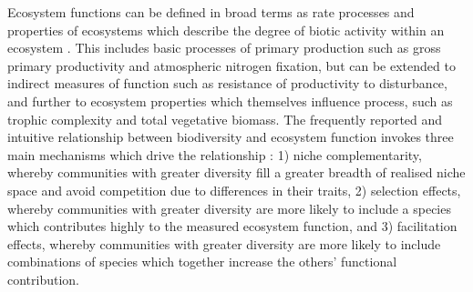 \documentclass[11pt,a4paper]{article}
\begin{document}
Ecosystem functions can be defined in broad terms as rate processes and properties of ecosystems which describe the degree of biotic activity within an ecosystem \citep{Jax2005}. This includes basic processes of primary production such as gross primary productivity and atmospheric nitrogen fixation, but can be extended to indirect measures of function such as resistance of productivity to disturbance, and further to ecosystem properties which themselves influence process, such as trophic complexity and total vegetative biomass. The frequently reported and intuitive relationship between biodiversity and ecosystem function invokes three main mechanisms which drive the relationship \citep{Tilman2014}: 1) niche complementarity, whereby communities with greater diversity fill a greater breadth of realised niche space and avoid competition due to differences in their traits, 2) selection effects, whereby communities with greater diversity are more likely to include a species which contributes highly to the measured ecosystem function, and 3) facilitation effects, whereby communities with greater diversity are more likely to include combinations of species which together increase the others' functional contribution.
\end{document}
